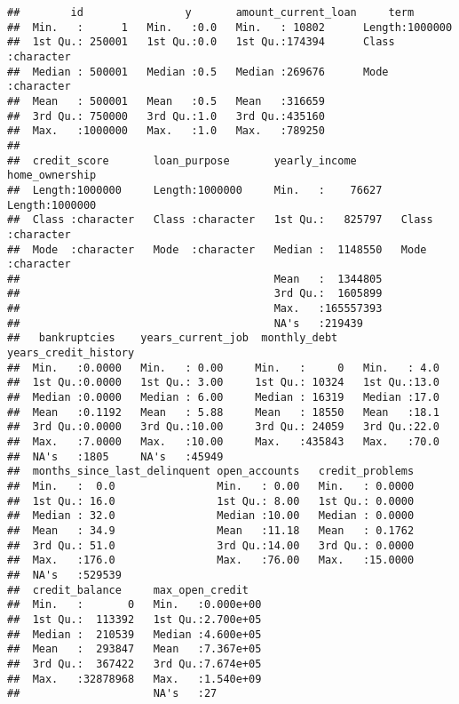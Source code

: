 \documentclass[
]{article}
\begin{document}
\begin{verbatim}
##        id                y       amount_current_loan     term          
##  Min.   :      1   Min.   :0.0   Min.   : 10802      Length:1000000    
##  1st Qu.: 250001   1st Qu.:0.0   1st Qu.:174394      Class :character  
##  Median : 500001   Median :0.5   Median :269676      Mode  :character  
##  Mean   : 500001   Mean   :0.5   Mean   :316659                        
##  3rd Qu.: 750000   3rd Qu.:1.0   3rd Qu.:435160                        
##  Max.   :1000000   Max.   :1.0   Max.   :789250                        
##                                                                        
##  credit_score       loan_purpose       yearly_income       home_ownership    
##  Length:1000000     Length:1000000     Min.   :    76627   Length:1000000    
##  Class :character   Class :character   1st Qu.:   825797   Class :character  
##  Mode  :character   Mode  :character   Median :  1148550   Mode  :character  
##                                        Mean   :  1344805                     
##                                        3rd Qu.:  1605899                     
##                                        Max.   :165557393                     
##                                        NA's   :219439                        
##   bankruptcies    years_current_job  monthly_debt    years_credit_history
##  Min.   :0.0000   Min.   : 0.00     Min.   :     0   Min.   : 4.0        
##  1st Qu.:0.0000   1st Qu.: 3.00     1st Qu.: 10324   1st Qu.:13.0        
##  Median :0.0000   Median : 6.00     Median : 16319   Median :17.0        
##  Mean   :0.1192   Mean   : 5.88     Mean   : 18550   Mean   :18.1        
##  3rd Qu.:0.0000   3rd Qu.:10.00     3rd Qu.: 24059   3rd Qu.:22.0        
##  Max.   :7.0000   Max.   :10.00     Max.   :435843   Max.   :70.0        
##  NA's   :1805     NA's   :45949                                          
##  months_since_last_delinquent open_accounts   credit_problems  
##  Min.   :  0.0                Min.   : 0.00   Min.   : 0.0000  
##  1st Qu.: 16.0                1st Qu.: 8.00   1st Qu.: 0.0000  
##  Median : 32.0                Median :10.00   Median : 0.0000  
##  Mean   : 34.9                Mean   :11.18   Mean   : 0.1762  
##  3rd Qu.: 51.0                3rd Qu.:14.00   3rd Qu.: 0.0000  
##  Max.   :176.0                Max.   :76.00   Max.   :15.0000  
##  NA's   :529539                                                
##  credit_balance     max_open_credit    
##  Min.   :       0   Min.   :0.000e+00  
##  1st Qu.:  113392   1st Qu.:2.700e+05  
##  Median :  210539   Median :4.600e+05  
##  Mean   :  293847   Mean   :7.367e+05  
##  3rd Qu.:  367422   3rd Qu.:7.674e+05  
##  Max.   :32878968   Max.   :1.540e+09  
##                     NA's   :27
\end{verbatim}
\end{document}
